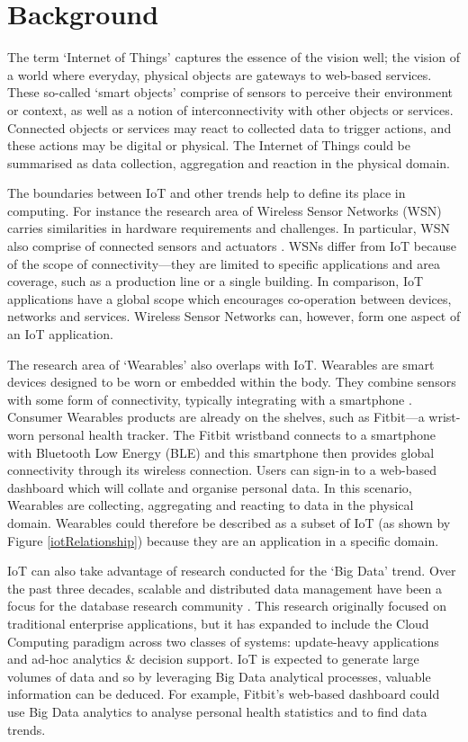 \chapter{Background}
  The term `Internet of Things' captures the essence of the vision well; the vision of a world where everyday, physical objects are gateways to web-based services. These so-called `smart objects' comprise of sensors to perceive their environment or context, as well as a notion of interconnectivity with other objects or services. Connected objects or services may react to collected data to trigger actions, and these actions may be digital or physical. The Internet of Things could be summarised as data collection, aggregation and reaction in the physical domain.

  The boundaries between IoT and other trends help to define its place in computing. For instance the research area of Wireless Sensor Networks (WSN) carries similarities in hardware requirements and challenges. In particular, WSN also comprise of connected sensors and actuators \citep{Mottola:2011}. WSNs differ from IoT because of the scope of connectivity---they are limited to specific applications and area coverage, such as a production line or a single building. In comparison, IoT applications have a global scope which encourages co-operation between devices, networks and services. Wireless Sensor Networks can, however, form one aspect of an IoT application.

  The research area of `Wearables' also overlaps with IoT. Wearables are smart devices designed to be worn or embedded within the body. They combine sensors with some form of connectivity, typically integrating with a smartphone \citep{6844949}. Consumer Wearables products are already on the shelves, such as Fitbit---a wrist-worn personal health tracker. The Fitbit wristband connects to a smartphone with Bluetooth Low Energy (BLE) and this smartphone then provides global connectivity through its wireless connection. Users can sign-in to a web-based dashboard which will collate and organise personal data. In this scenario, Wearables are collecting, aggregating and reacting to data in the physical domain. Wearables could therefore be described as a subset of IoT (as shown by Figure \ref{iotRelationship}) because they are an application in a specific domain.

  IoT can also take advantage of research conducted for the `Big Data' trend. Over the past three decades, scalable and distributed data management have been a focus for the database research community \citep{Agrawal}. This research originally focused on traditional enterprise applications, but it has expanded to include the Cloud Computing paradigm across two classes of systems: update-heavy applications and ad-hoc analytics \& decision support. IoT is expected to generate large volumes of data and so by leveraging Big Data analytical processes, valuable information can be deduced. For example, Fitbit's web-based dashboard could use Big Data analytics to analyse personal health statistics and to find data trends. 

